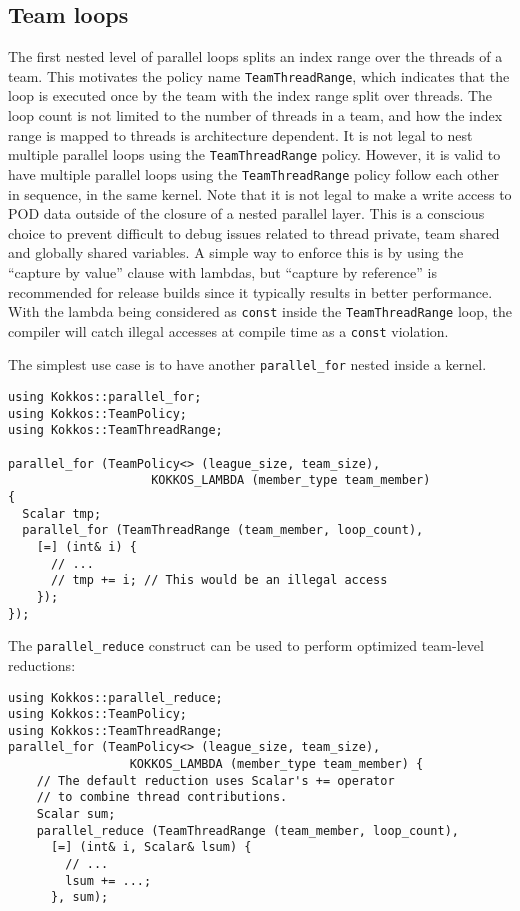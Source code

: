 \begin{enumerate}
\subsection{Team loops}\label{SS:Hierarchical:Nested:Loops:Team}

The first nested level of parallel loops splits an index range over the threads of a team. 
This motivates the policy name \lstinline|TeamThreadRange|, 
which indicates that the loop is executed once by the team with the index range split over threads.
The loop count is not limited to the number of threads in a team, and how the index range is mapped to threads is architecture dependent.
It is not legal to nest multiple parallel loops using the \lstinline!TeamThreadRange! policy.
However, it is valid to have multiple parallel loops using the \lstinline!TeamThreadRange! policy follow each other in sequence, in the same kernel.  
Note that it is not legal to make a write access to POD data outside of the closure of a nested parallel layer. 
This is a conscious choice to prevent difficult to debug issues related to thread private, team shared and globally shared variables. 
A simple way to enforce this is by using the ``capture by value'' clause with lambdas, 
but ``capture by reference'' is recommended for release builds since it typically results in better performance.
With the lambda being considered as \lstinline|const| inside the \lstinline!TeamThreadRange! loop,
the compiler will catch illegal accesses at compile time as a \lstinline|const| violation.  

The simplest use case is to have another \lstinline|parallel_for| nested inside a kernel. 
\begin{lstlisting}
using Kokkos::parallel_for;
using Kokkos::TeamPolicy;
using Kokkos::TeamThreadRange;

parallel_for (TeamPolicy<> (league_size, team_size), 
                    KOKKOS_LAMBDA (member_type team_member)
{
  Scalar tmp;
  parallel_for (TeamThreadRange (team_member, loop_count), 
    [=] (int& i) {
      // ...
      // tmp += i; // This would be an illegal access
    });
});
\end{lstlisting}

The \lstinline|parallel_reduce| construct can be used to perform optimized team-level reductions:

\begin{lstlisting}
using Kokkos::parallel_reduce;
using Kokkos::TeamPolicy;
using Kokkos::TeamThreadRange;
parallel_for (TeamPolicy<> (league_size, team_size),
                 KOKKOS_LAMBDA (member_type team_member) {
    // The default reduction uses Scalar's += operator
    // to combine thread contributions.
    Scalar sum;
    parallel_reduce (TeamThreadRange (team_member, loop_count), 
      [=] (int& i, Scalar& lsum) {
        // ... 
        lsum += ...;
      }, sum);


\end{lstlisting}
\end{enumerate}
